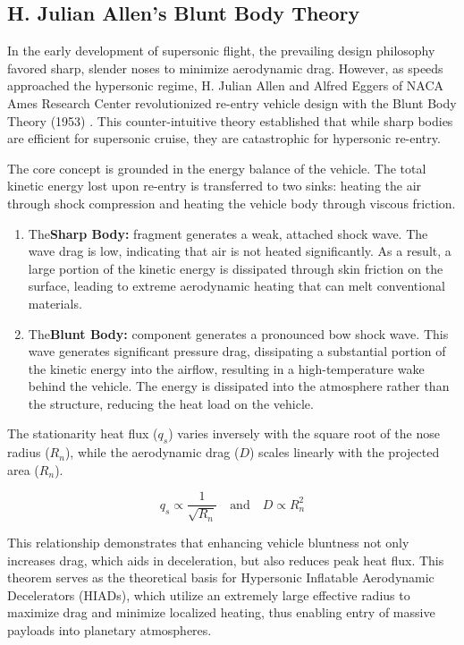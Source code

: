 \subsection{H. Julian Allen’s Blunt Body Theory }
\par
In the early development of supersonic flight, the prevailing design philosophy favored sharp, slender noses to minimize aerodynamic drag. However, as speeds approached the hypersonic regime, H. Julian Allen and Alfred Eggers of NACA Ames Research Center revolutionized re-entry vehicle design with the Blunt Body Theory (1953) \cite{AndersonHypersonic}. This counter-intuitive theory established that while sharp bodies are efficient for supersonic cruise, they are catastrophic for hypersonic re-entry.
\par
The core concept is grounded in the energy balance of the vehicle. The total kinetic energy lost upon re-entry is transferred to two sinks: heating the air through shock compression and heating the vehicle body through viscous friction.

\begin{enumerate}
    \item The\textbf{Sharp Body:} fragment generates a weak, attached shock wave. The wave drag is low, indicating that air is not heated significantly. As a result, a large portion of the kinetic energy is dissipated through skin friction on the surface, leading to extreme aerodynamic heating that can melt conventional materials.

    \item The\textbf{Blunt Body:} component generates a pronounced bow shock wave. This wave generates significant pressure drag, dissipating a substantial portion of the kinetic energy into the airflow, resulting in a high-temperature wake behind the vehicle. The energy is dissipated into the atmosphere rather than the structure, reducing the heat load on the vehicle.
\end{enumerate}

The stationarity heat flux ($q_s$) varies inversely with the square root of the nose radius ($R_n$), while the aerodynamic drag ($D$) scales linearly with the projected area ($R_n$).

\begin{equation}
    q_s \propto \frac{1}{\sqrt{R_n}} \quad \text{and} \quad D \propto R_n^2
\end{equation}

This relationship demonstrates that enhancing vehicle bluntness not only increases drag, which aids in deceleration, but also reduces peak heat flux. This theorem serves as the theoretical basis for Hypersonic Inflatable Aerodynamic Decelerators (HIADs), which utilize an extremely large effective radius to maximize drag and minimize localized heating, thus enabling entry of massive payloads into planetary atmospheres.

